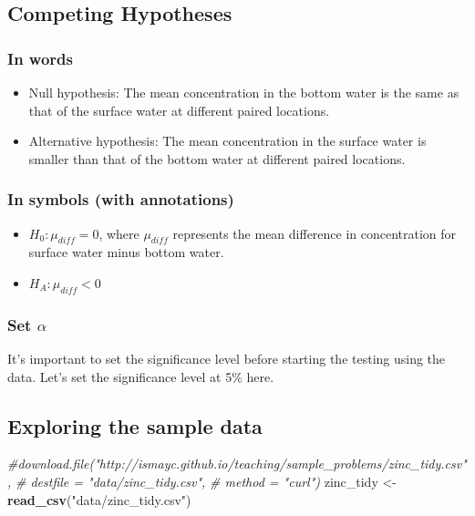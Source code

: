 \documentclass[]{tufte-book}
\newenvironment{Shaded}{\begin{snugshade}}{\end{snugshade}}
\newcommand{\KeywordTok}[1]{\textcolor[rgb]{0.13,0.29,0.53}{\textbf{{#1}}}}
\newcommand{\StringTok}[1]{\textcolor[rgb]{0.31,0.60,0.02}{{#1}}}
\newcommand{\CommentTok}[1]{\textcolor[rgb]{0.56,0.35,0.01}{\textit{{#1}}}}
\newcommand{\NormalTok}[1]{{#1}}
\providecommand{\tightlist}{%
  \setlength{\itemsep}{0pt}\setlength{\parskip}{0pt}}
\begin{document}
\subsection{Competing Hypotheses}\label{competing-hypotheses-4}

\subsubsection{In words}\label{in-words-4}

\begin{itemize}
\item
  Null hypothesis: The mean concentration in the bottom water is the
  same as that of the surface water at different paired locations.
\item
  Alternative hypothesis: The mean concentration in the surface water is
  smaller than that of the bottom water at different paired locations.
\end{itemize}

\subsubsection{In symbols (with
annotations)}\label{in-symbols-with-annotations-4}

\begin{itemize}
\tightlist
\item
  \(H_0: \mu_{diff} = 0\), where \(\mu_{diff}\) represents the mean
  difference in concentration for surface water minus bottom water.
\item
  \(H_A: \mu_{diff} < 0\)
\end{itemize}

\subsubsection{\texorpdfstring{Set
\(\alpha\)}{Set \textbackslash{}alpha}}\label{set-alpha-4}

It's important to set the significance level before starting the testing
using the data. Let's set the significance level at 5\% here.

\subsection{Exploring the sample
data}\label{exploring-the-sample-data-4}

\begin{Shaded}
\begin{Highlighting}[]
\CommentTok{#download.file("http://ismayc.github.io/teaching/sample_problems/zinc_tidy.csv",}
\CommentTok{#              destfile = "data/zinc_tidy.csv",}
\CommentTok{#              method = "curl")}
\NormalTok{zinc_tidy <-}\StringTok{ }\KeywordTok{read_csv}\NormalTok{(}\StringTok{"data/zinc_tidy.csv"}\NormalTok{)}
\end{Highlighting}
\end{Shaded}
\end{document}
